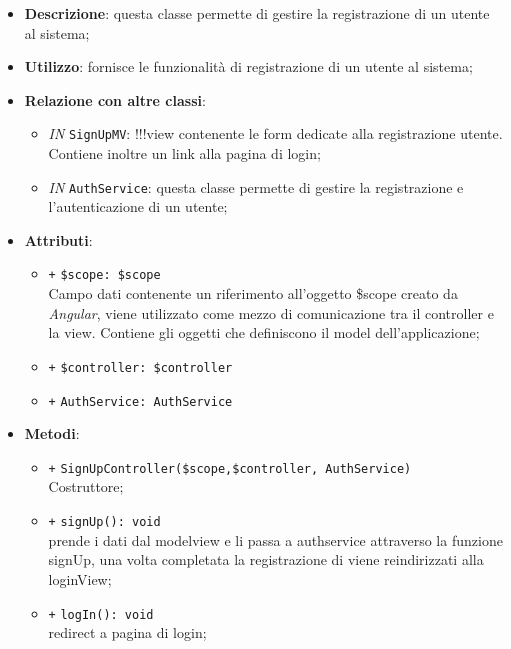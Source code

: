 \begin{itemize}
	\item \textbf{Descrizione}: questa classe permette di gestire la registrazione di un utente al sistema;
	\item \textbf{Utilizzo}: fornisce le funzionalità di registrazione di un utente al sistema;
	\item \textbf{Relazione con altre classi}:
	\begin{itemize}
		\item \textit{IN} \texttt{SignUpMV}: !!!view contenente le form dedicate alla registrazione utente. Contiene inoltre un link alla pagina di login;
		\item \textit{IN} \texttt{AuthService}: questa classe permette di gestire la registrazione e l'autenticazione di un utente;
	\end{itemize}
	\item \textbf{Attributi}:
	\begin{itemize}
		\item \texttt{+} \texttt{\$scope: \$scope} \\
		Campo dati contenente un riferimento all’oggetto \$scope creato da \textit{Angular}, viene utilizzato come mezzo di comunicazione tra il controller e la view. Contiene gli oggetti che definiscono il model dell’applicazione;
		\item \texttt{+} \texttt{\$controller: \$controller} \\
		\item \texttt{+} \texttt{AuthService: AuthService} \\
	\end{itemize}
	\item \textbf{Metodi}:
	\begin{itemize}
		\item \texttt{+} \texttt{SignUpController(\$scope,\$controller, AuthService)} \\
		Costruttore;
		\item \texttt{+} \texttt{signUp(): void} \\
		prende i dati dal modelview e li passa a authservice attraverso la funzione signUp, una volta completata la registrazione di viene reindirizzati alla loginView;
		\item \texttt{+} \texttt{logIn(): void} \\
		redirect a pagina di login;
	
	\end{itemize}
\end{itemize}

